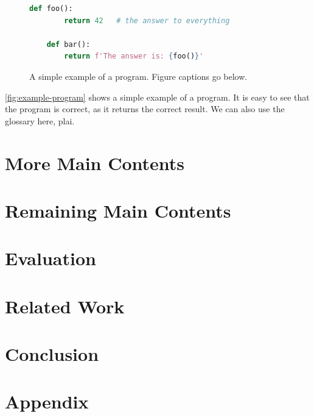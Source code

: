 \documentclass[thesis]{plai}
\begin{document}
\lipsum[2-8]

\begin{figure}[t]
    \begin{lstlisting}[language=Python, gobble=4]
    def foo():
        return 42   # the answer to everything

    def bar():
        return f'The answer is: {foo()}'
    \end{lstlisting}
    \caption{A simple example of a program. Figure captions go below.}
    \label{fig:example-program}
\end{figure}

\autoref{fig:example-program} shows a simple example of a program.
It is easy to see that the program is correct, as it returns the correct result.
We can also use the glossary here, \gls{plai}.

\chapter{More Main Contents}
\label{chapter:content2}

\lipsum[2-3]


\chapter{Remaining Main Contents}
\label{chapter:content3}

\lipsum[2-3]

\chapter{Evaluation}
\label{chapter:evaluation}



\chapter{Related Work}
\label{chapter:related-work}



\chapter{Conclusion}
\label{chapter:conclusion}






\chapter*{Appendix}
\label{chapter:appendix}



\listoffigures{}
\listoftables{}

\printglossaries
\end{document}
